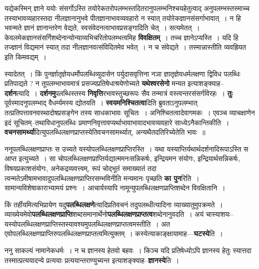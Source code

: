 \documentclass[article,12pt,a4paper]{memoir}
\begin{document}
	  \endgroup
	

	  \pstart यद्येकस्मिन् ज्ञाने ययोः संसर्गोऽस्ति तयोरेकतरोपलम्भस्तदितरानुपलम्भनिश्चयहेतुत्वाद् अनुपलम्भस्तस्माच्च तस्याभावव्यहारस्तदा नीलज्ञानानुभवे पीतज्ञानाभावव्यवहारो न स्यात् तयोरेकज्ञा\leavevmode{}नसंसर्गाभावात् । न हि भवन्मते ज्ञानं ज्ञानान्तरेण वेद्यते, स्वसंवेदनत्वाभावप्रसङ्गादिति चेत् । सत्यमेतत् । केवलमेकज्ञानसंसर्गिशब्देनान्योन्याव्यभिचरितोपलम्भत्वमिह \textbf{विवक्षितम्} । तच्च ज्ञानेऽप्यस्ति । यदि हि तज्ज्ञानं विद्यमानं स्यात् तदा नीलज्ञानवत्संविदितमेव भवेत् । न च संवेद्यते । तस्मान्नास्तीति व्यवह्रियत इति किमवद्यम् ।
	\pend
      

	  \pstart स्यादेतत् । किं पुनर्ज्ञातृज्ञेयधर्मोपलब्धिव्युदासेन पर्युदासवृत्तिना नञा ज्ञातृज्ञेयधर्मलक्षणा द्विविध पलब्धिः प्रतिपाद्यते ? न तूपलम्भाभावमात्रं प्रसज्यप्रतिषेधाश्रयेणोच्यते \textbf{यथेश्वरसेनो} मन्यत इत्याशङ्क्याह--\textbf{दर्शन}त्यादि । \textbf{दर्शनमु}पलब्धिस्तस्य \textbf{निवृत्ति}रभावस्तुच्छरूपः सैव तन्मात्रं वस्त्वन्तरसंसर्गविरहः । \textbf{तुः} पूर्वस्मादनुपलम्भाद् वैधर्म्यमस्य द्योतयति । \textbf{स्वयमनिश्चितत्वा}दिति ब्रुवताऽनुपलम्भात् तत्प्रतिपत्तावनवस्थादोषप्रसङ्गेन तस्य साधकाभावः सूचितः । अनिश्चितत्वादेवागमकः । एवञ्च व्याचक्षाणेन इदं सूचितम्--तथाविधानुपलब्धिः प्रमाणनिवृत्तावप्यर्थाभावाभावादभावव्यवहारे साध्येऽनैकान्तिकीति । \textbf{वचनसामर्थ्या}दित्युपलब्धिलक्षणप्राप्तस्येतिवचनसामर्थ्यात्, अन्यथैतदतिरिच्येतेति भावः ॥
	\pend
      

	  \pstart ननूपलब्धिलक्षणप्राप्तः स उच्यते यस्योपलब्धिलक्षणप्राप्तिरस्ति । यथा यस्याप्तिर्यथार्थदर्शनादिरूपाऽस्ति स आप्त इत्युच्यते । सा चोपलब्धिलक्षणप्राप्तिर्यद्यात्ममनःसन्निकर्षः, इन्द्रियमन संयोगः, इन्द्रियार्थसन्निकर्षः, विषयप्रकाशसंयोगः, अनेकद्रव्यवत्त्वम्, रूपं चोद्भूतं समाख्यातं तदा त्वन्मतेऽमीषामभावादुपलब्धिलक्षणप्राप्तिरसम्भविनीति मन्यमानः पृच्छति \textbf{का पुन}रिति । सामान्यविशेषाकाराभ्यामयं प्रश्नः । आचार्यस्यापि नामून्युपलब्धिलक्षणप्राप्तिशब्देन विवक्षितानि ।
	\pend
      

	  \pstart किं तर्हीयमित्यभिप्रायेण यदु\textbf{पलब्धिलक्षणे}त्यादिप्रतिवचनं तदुपलब्धीत्यादिना व्याख्यातुमुपक्रमते । व्याख्येयमेवो\textbf{पलब्धिलक्षणप्राप्ति}शब्दसमानार्थेनो\textbf{पलब्धिलक्षणप्राप्तत्व}शब्देनानुवदति । अयं चास्याशयः--यस्योपलब्धिलक्षणप्राप्तिस्तस्यावश्यमुपलब्धिलक्षणप्राप्तत्वमस्तीति । अत एवोपलब्धिलक्षणप्राप्तिरुपलब्धिलक्षणप्राप्तत्वमित्युक्तम् । कस्येत्याकाङ्क्षायामाह—\textbf{घटस्ये}ति ।
	\pend
      

	  \pstart ननु साकल्यं नामानेकधर्मः । न च ज्ञानस्य हेतवो बहवः । किञ्च यदि प्रतिषेध्योऽपि ज्ञानस्य हेतुः स्यात्तदा तस्मात्प्रत्ययादन्ये प्रत्ययाः प्रत्ययान्तराण्युच्यन्त इत्याशङ्क्याह--\textbf{ज्ञानस्ये}ति । \leavevmode{} 
	  
\end{document}
